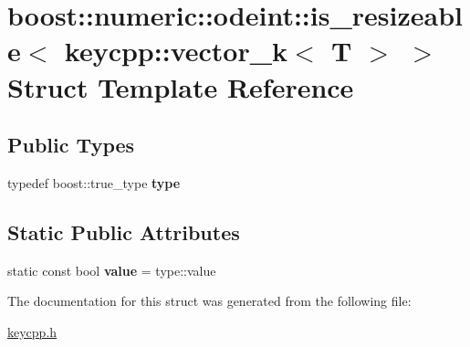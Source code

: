 \hypertarget{structboost_1_1numeric_1_1odeint_1_1is__resizeable_3_01keycpp_1_1vector__k_3_01_t_01_4_01_4}{\section{boost\-:\-:numeric\-:\-:odeint\-:\-:is\-\_\-resizeable$<$ keycpp\-:\-:vector\-\_\-k$<$ T $>$ $>$ Struct Template Reference}
\label{structboost_1_1numeric_1_1odeint_1_1is__resizeable_3_01keycpp_1_1vector__k_3_01_t_01_4_01_4}
}
\subsection*{Public Types}
\begin{DoxyCompactItemize}
\item 
\hypertarget{structboost_1_1numeric_1_1odeint_1_1is__resizeable_3_01keycpp_1_1vector__k_3_01_t_01_4_01_4_a2ca1ce78b24323da779c4f39b56a03be}{typedef boost\-::true\-\_\-type {\bfseries type}}\label{structboost_1_1numeric_1_1odeint_1_1is__resizeable_3_01keycpp_1_1vector__k_3_01_t_01_4_01_4_a2ca1ce78b24323da779c4f39b56a03be}

\end{DoxyCompactItemize}
\subsection*{Static Public Attributes}
\begin{DoxyCompactItemize}
\item 
\hypertarget{structboost_1_1numeric_1_1odeint_1_1is__resizeable_3_01keycpp_1_1vector__k_3_01_t_01_4_01_4_a5d0fce0d73884387eacdedeccc44b6c3}{static const bool {\bfseries value} = type\-::value}\label{structboost_1_1numeric_1_1odeint_1_1is__resizeable_3_01keycpp_1_1vector__k_3_01_t_01_4_01_4_a5d0fce0d73884387eacdedeccc44b6c3}

\end{DoxyCompactItemize}


The documentation for this struct was generated from the following file\-:\begin{DoxyCompactItemize}
\item 
\hyperlink{keycpp_8h}{keycpp.\-h}\end{DoxyCompactItemize}
